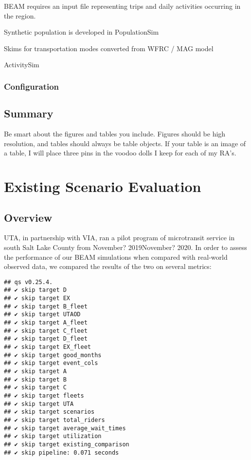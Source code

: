 \documentclass[
]{article}
\begin{document}
BEAM requires an input file representing trips and daily activities occurring in the region.

Synthetic population is developed in PopulationSim

Skims for transportation modes converted from WFRC / MAG model

ActivitySim

\hypertarget{configuration}{%
\subsubsection{Configuration}\label{configuration}}

\hypertarget{summary-1}{%
\subsection{Summary}\label{summary-1}}

Be smart about the figures and tables you include. Figures should be high resolution, and tables should always be table objects. If your table is an image of a table, I will place three pins in the voodoo dolls I keep for each of my RA's.

\hypertarget{existing-scenario-evaluation}{%
\section{Existing Scenario Evaluation}\label{existing-scenario-evaluation}}

\hypertarget{overview-2}{%
\subsection{Overview}\label{overview-2}}

UTA, in partnership with VIA, ran a pilot program of microtransit service in south Salt Lake County from November? 2019\textendash November? 2020. In order to assess the performance of our BEAM simulations when compared with real-world observed data, we compared the results of the two on several metrics:

\begin{verbatim}
## qs v0.25.4.
## ✔ skip target D
## ✔ skip target EX
## ✔ skip target B_fleet
## ✔ skip target UTAOD
## ✔ skip target A_fleet
## ✔ skip target C_fleet
## ✔ skip target D_fleet
## ✔ skip target EX_fleet
## ✔ skip target good_months
## ✔ skip target event_cols
## ✔ skip target A
## ✔ skip target B
## ✔ skip target C
## ✔ skip target fleets
## ✔ skip target UTA
## ✔ skip target scenarios
## ✔ skip target total_riders
## ✔ skip target average_wait_times
## ✔ skip target utilization
## ✔ skip target existing_comparison
## ✔ skip pipeline: 0.071 seconds
\end{verbatim}
\end{document}
